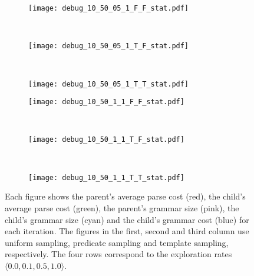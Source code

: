 \documentclass[a4paper]{article}
\begin{document}
\begin{figure}
        \begin{subfigure}[b]{0.3\textwidth}
                \centering
                \texttt{[image: debug\_10\_50\_05\_1\_F\_F\_stat.pdf]}
                \caption{}
                \label{fig:costsG}
        \end{subfigure}%
        ~ %
        \begin{subfigure}[b]{0.3\textwidth}
                \centering
                \texttt{[image: debug\_10\_50\_05\_1\_T\_F\_stat.pdf]}
                \caption{}
                \label{fig:costsH}
        \end{subfigure}
        ~ %
        \begin{subfigure}[b]{0.3\textwidth}
                \centering
                \texttt{[image: debug\_10\_50\_05\_1\_T\_T\_stat.pdf]}
                \caption{}
                \label{fig:costsI}
        \end{subfigure}

        \begin{subfigure}[b]{0.3\textwidth}
                \centering
                \texttt{[image: debug\_10\_50\_1\_1\_F\_F\_stat.pdf]}
                \caption{}
                \label{fig:costsJ}
        \end{subfigure}%
        ~ %
        \begin{subfigure}[b]{0.3\textwidth}
                \centering
                \texttt{[image: debug\_10\_50\_1\_1\_T\_F\_stat.pdf]}
                \caption{}
                \label{fig:costsK}
        \end{subfigure}
        ~ %
        \begin{subfigure}[b]{0.3\textwidth}
                \centering
                \texttt{[image: debug\_10\_50\_1\_1\_T\_T\_stat.pdf]}
                \caption{}
                \label{fig:costsL}
        \end{subfigure}

        \caption{Each figure shows the parent's average parse cost (red), the child's average parse cost (green), the parent's grammar size (pink), the child's grammar size (cyan) and the child's grammar cost (blue) for each iteration. The figures in the first, second and third column use uniform sampling, predicate sampling and template sampling, respectively. The four rows correspond to the exploration rates $\langle 0.0, 0.1, 0.5, 1.0 \rangle$.}
        \label{fig:costs}
\end{figure}
\end{document}
